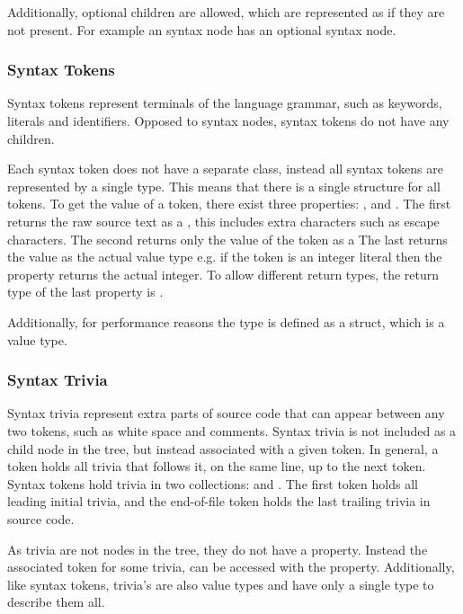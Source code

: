 Additionally, optional children are allowed, which are represented as  if they are not present. For example an  syntax node has an optional  syntax node\cite[p. 7]{ng2012roslyn}.

\subsubsection{Syntax Tokens}
Syntax tokens represent terminals of the language grammar, such as keywords, literals and identifiers. Opposed to syntax nodes, syntax tokens do not have any children. 

Each syntax token does not have a separate class, instead all syntax tokens are represented by a single  type. This means that there is a single structure for all tokens. To get the value of a token, there exist three properties: ,  and . The first returns the raw source text as a , this includes extra characters such as escape characters. The second returns only the value of the token as a  The last returns the value as the actual value type e.g. if the token is an integer literal then the property returns the actual integer. To allow different return types, the return type of the last property is \cite[p. 7-8]{ng2012roslyn}.

Additionally, for performance reasons the  type is defined as a struct, which is a value type\cite[p. 7]{ng2012roslyn}.

\subsubsection{Syntax Trivia}
Syntax trivia represent extra parts of source code that can appear between any two tokens, such as white space and comments. Syntax trivia is not included as a child node in the tree, but instead associated with a given token. In general, a token holds all trivia that follows it, on the same line, up to the next token. Syntax tokens hold trivia in two collections:  and . The first token holds all leading initial trivia, and the end-of-file token holds the last trailing trivia in source code\cite[p. 8]{ng2012roslyn}.

As trivia are not nodes in the tree, they do not have a  property. Instead the associated token for some trivia, can be accessed with the  property. Additionally, like syntax tokens, trivia's are also value types and have only a single  type to describe them all.

